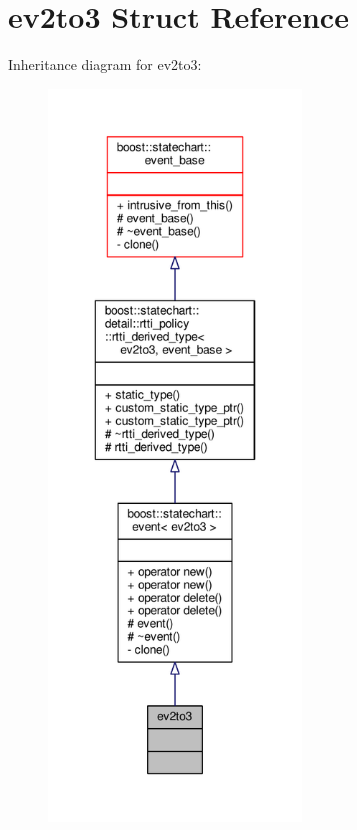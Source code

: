 \hypertarget{structev2to3}{}\section{ev2to3 Struct Reference}
\label{structev2to3}


Inheritance diagram for ev2to3\+:
\nopagebreak
\begin{figure}[H]
\begin{center}
\leavevmode
\includegraphics[height=550pt]{structev2to3__inherit__graph}
\end{center}
\end{figure}


